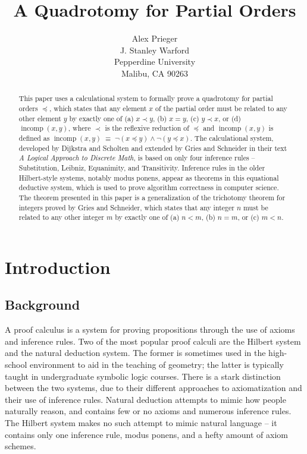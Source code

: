 \documentclass[12pt, fleqn, leqno]{article}
\title{A Quadrotomy for Partial Orders}
\author{
   Alex Prieger\\
   J. Stanley Warford\\
   Pepperdine University\\
   Malibu, CA 90263}
\date{} %
\newcommand{\equivs}{\ensuremath{\;\equiv\;}}       %
\DeclareMathOperator{\incomp}{incomp}
\begin{document}
\maketitle
\begin{abstract}

This paper uses a calculational system to formally prove a quadrotomy for partial orders $\preceq$, which states that any element $x$ of the partial order must be related to any other element $y$ by exactly one of (a) $x \prec y$, (b) $x=y$, (c) $y\prec x$, or (d) $\incomp(x,y)$, where $\prec$ is the reflexive reduction of $\preceq$ and $\incomp(x,y)$ is defined as $\incomp(x,y) \equivs \neg (x\preceq y) \land \neg (y\preceq x)$.
The calculational system, developed by Dijkstra and Scholten and extended by Gries and Schneider in their text \textit{A Logical Approach to Discrete Math}, is based on only four inference rules -- Substitution, Leibniz, Equanimity, and Transitivity. 
Inference rules in the older Hilbert-style systems, notably modus ponens, appear as theorems in this equational deductive system, which is used to prove algorithm correctness in computer science.
The theorem presented in this paper is a generalization of the trichotomy theorem for integers proved by Gries and Schneider, which states that any integer $n$ must be related to any other integer $m$ by exactly one of (a) $n<m$, (b) $n=m$, or (c) $m<n$.

\end{abstract}

\thispagestyle{plain}

\section{Introduction}

\subsection{Background}

A proof calculus is a system for proving propositions through the use of axioms and inference rules. Two of the most popular proof calculi are the Hilbert system and the natural deduction system. The former is sometimes used in the high-school environment to aid in the teaching of geometry; the latter is typically taught in undergraduate symbolic logic courses. There is a stark distinction between the two systems, due to their different approaches to axiomatization and their use of inference rules. Natural deduction attempts to mimic how people naturally reason, and contains few or no axioms and numerous inference rules. The Hilbert system makes no such attempt to mimic natural language -- it contains only one inference rule, modus ponens, and a hefty amount of axiom schemes.
\end{document}
